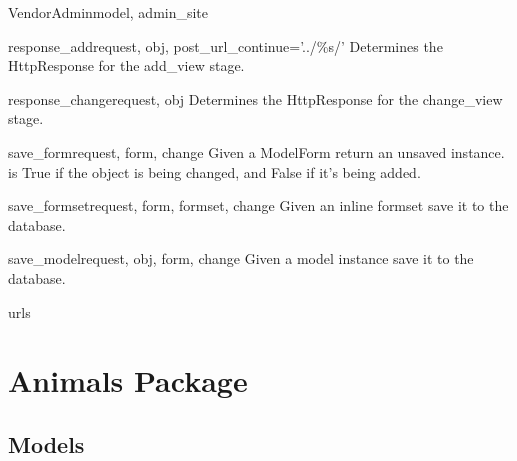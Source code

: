 \documentclass[letterpaper,10pt,english]{sphinxmanual}
\begin{document}
\begin{classdesc}{VendorAdmin}{model, admin\_site}
\hypertarget{data.admin.VendorAdmin.response_add}{}\begin{methoddesc}{response\_add}{request, obj, post\_url\_continue='../\%s/'}
Determines the HttpResponse for the add\_view stage.
\end{methoddesc}

\hypertarget{data.admin.VendorAdmin.response_change}{}\begin{methoddesc}{response\_change}{request, obj}
Determines the HttpResponse for the change\_view stage.
\end{methoddesc}

\hypertarget{data.admin.VendorAdmin.save_form}{}\begin{methoddesc}{save\_form}{request, form, change}
Given a ModelForm return an unsaved instance.  is True if
the object is being changed, and False if it's being added.
\end{methoddesc}

\hypertarget{data.admin.VendorAdmin.save_formset}{}\begin{methoddesc}{save\_formset}{request, form, formset, change}
Given an inline formset save it to the database.
\end{methoddesc}

\hypertarget{data.admin.VendorAdmin.save_model}{}\begin{methoddesc}{save\_model}{request, obj, form, change}
Given a model instance save it to the database.
\end{methoddesc}

\hypertarget{data.admin.VendorAdmin.urls}{}\begin{memberdesc}{urls}\end{memberdesc}
\end{classdesc}


\section{Animals Package}
\hypertarget{module-animal}{}
\modulesynopsis{}

\subsection{Models}
\hypertarget{module-animal.models}{}
\modulesynopsis{}
\end{document}
